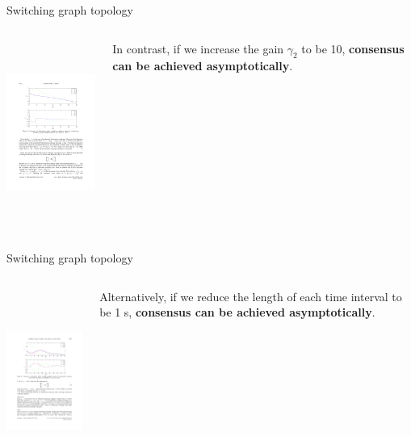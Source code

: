 \begin{frame}{Switching graph topology}

\begin{columns}
 \begin{column}{.70\textwidth}
	\begin{center}
		\includegraphics[height=6cm]{images/Switch2.pdf}
	\end{center}
	\vskip 0.3cm
 \end{column}

 \begin{column}{.30\textwidth}
	 In contrast, if we increase the gain $\gamma_2$ to be 10, 
	 {\textcolor{green!40!black}{\fontsize{13}{15}\textbf{consensus can be achieved asymptotically}}}.
 \end{column}
\end{columns}
\vskip 0.3cm

\end{frame}

\begin{frame}{Switching graph topology}

\begin{columns}
 \begin{column}{.70\textwidth}
	\begin{center}
		\includegraphics[height=6cm]{images/Switch3.pdf}
	\end{center}
	\vskip 0.3cm
 \end{column}

 \begin{column}{.30\textwidth}
	 Alternatively, if we reduce the length of each time interval to be 1 s,
	 {\textcolor{green!40!black}{\fontsize{13}{15}\textbf{consensus can be achieved asymptotically}}}.
 \end{column}
\end{columns}
\vskip 0.3cm

\end{frame}

